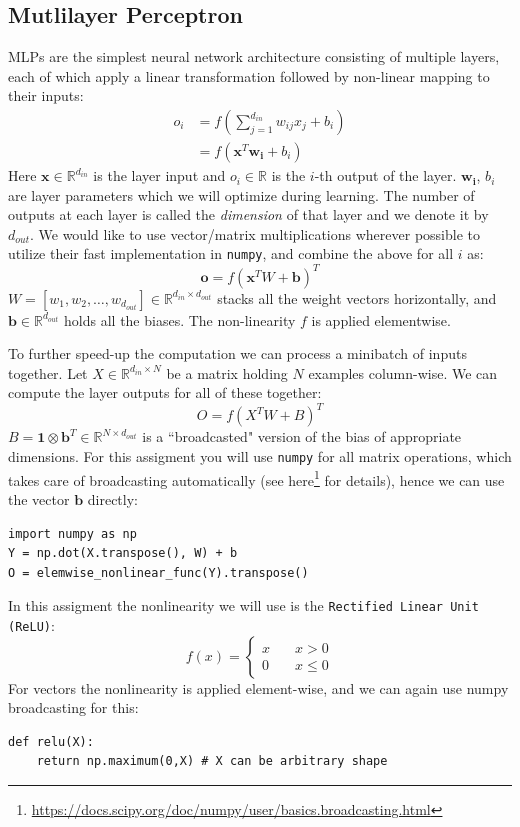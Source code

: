 \documentclass[12pt]{article}
\newcommand{\cd}[1]{\texttt{#1}}
\begin{document}
\subsection{Mutlilayer Perceptron}
MLPs are the simplest neural network architecture consisting of multiple layers, each of 
which apply a linear transformation followed by non-linear mapping to their inputs:
\begin{align*}
    o_i &= f(\sum_{j=1}^{d_{in}} w_{ij} x_j + b_i) \\
            &= f(\mathbf{x}^T \mathbf{w_i} + b_i)
\end{align*}
Here $\mathbf{x} \in \mathbb{R}^{d_{in}}$ is the layer input and $o_i \in \mathbb{R}$ is the 
$i$-th output of the layer. $\mathbf{w_i}$, $b_i$ are layer parameters which we will optimize
during learning. The number of outputs at each layer is called the \textit{dimension}
of that layer and we denote it by $d_{out}$. We would like to use vector/matrix multiplications 
wherever possible to utilize their fast implementation in \texttt{numpy}, and combine the above
for all $i$ as:
\begin{equation*}
    \mathbf{o} = f(\mathbf{x}^T W + \mathbf{b})^T
\end{equation*}
$W=[w_1,w_2,\ldots,w_{d_{out}}] \in \mathbb{R}^{d_{in} \times d_{out}}$ stacks all the weight vectors 
horizontally, and $\mathbf{b} \in \mathbb{R}^{d_{out}}$ holds all the biases. The non-linearity $f$ is
applied elementwise.

To further speed-up the computation we can process a minibatch of inputs together. Let $X \in \mathbb{R}^{d_{in} \times N}$
be a matrix holding $N$ examples column-wise. We can compute the layer outputs for all of these together:
\begin{equation}
    O = f(X^T W + B)^T
\end{equation}
$B = \mathbf{1} \otimes \mathbf{b}^T \in \mathbb{R}^{N \times d_{out}}$ is a ``broadcasted" version of the bias
of appropriate dimensions. For this assigment you will use \cd{numpy} for all matrix operations, which takes care
of broadcasting automatically (see here\footnote{\url{https://docs.scipy.org/doc/numpy/user/basics.broadcasting.html}}
for details), hence we can use the vector $\mathbf{b}$ directly:
\begin{verbatim}
import numpy as np
Y = np.dot(X.transpose(), W) + b
O = elemwise_nonlinear_func(Y).transpose()
\end{verbatim}

In this assigment the nonlinearity we will use is the \texttt{Rectified Linear Unit (ReLU)}:
\begin{equation*}
    f(x) = 
    \begin{cases}
        x &\quad x>0 \\
        0 &\quad x\leq0
    \end{cases}
\end{equation*}
For vectors the nonlinearity is applied element-wise, and we can again use numpy broadcasting for
this:
\begin{verbatim}
def relu(X):
    return np.maximum(0,X) # X can be arbitrary shape
\end{verbatim}
\end{document}
